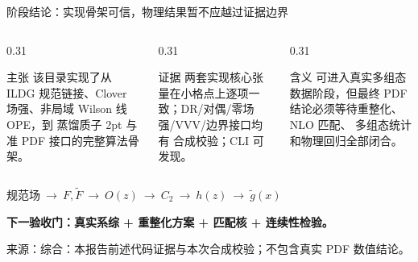 \documentclass[UTF8,aspectratio=169,11pt]{ctexbeamer}
\newcommand{\source}[1]{%
  \vspace{0.06em}\par{\raggedright\scriptsize\color{muted}来源：#1\par}}
\begin{document}
\begin{frame}[t]{阶段结论：实现骨架可信，物理结果暂不应越过证据边界}
  \begin{columns}[T,totalwidth=\textwidth]
    \begin{column}{0.31\textwidth}
      \begin{block}{主张}
        该目录实现了从 ILDG 规范链接、Clover 场强、非局域 Wilson 线 OPE，到
        蒸馏质子 2pt 与准 PDF 接口的完整算法骨架。
      \end{block}
    \end{column}
    \begin{column}{0.31\textwidth}
      \begin{block}{证据}
        两套实现核心张量在小格点上逐项一致；DR/对偶/零场强/VVV/边界接口均有
        合成校验；CLI 可发现。
      \end{block}
    \end{column}
    \begin{column}{0.31\textwidth}
      \begin{block}{含义}
        可进入真实多组态数据阶段，但最终 PDF 结论必须等待重整化、NLO 匹配、
        多组态统计和物理回归全部闭合。
      \end{block}
    \end{column}
  \end{columns}
  \vspace{0.35cm}
  \begin{center}
    \Large
    \textcolor{primary}{\(\text{规范场}\ \to\ F,\widetilde F\ \to\ O(z)\ \to\ C_2\ \to\ h(z)\ \to\ \widetilde g(x)\)}
  \end{center}
  \vspace{0.25cm}
  \begin{center}
    \textcolor{warning}{\textbf{下一验收门：真实系综 + 重整化方案 + 匹配核 + 连续性检验。}}
  \end{center}
  \source{综合：本报告前述代码证据与本次合成校验；不包含真实 PDF 数值结论。}
\end{frame}

\appendix
\end{document}
